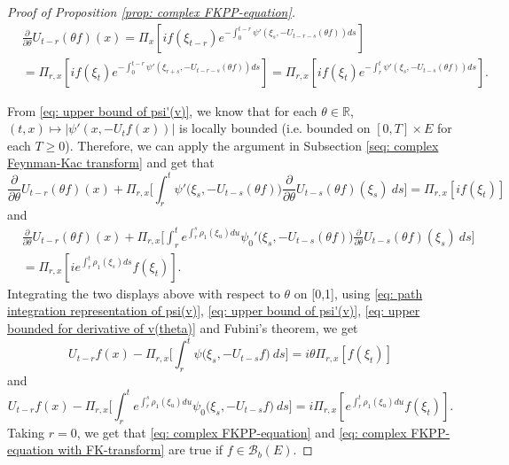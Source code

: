 \documentclass[12pt,a4paper]{amsart}
\theoremstyle{plain}
\theoremstyle{definition}
\numberwithin{equation}{section}
\begin{document}
\begin{proof}[Proof of Proposition \ref{prop: complex FKPP-equation}]
\begin{equation}\begin{split}
    &\frac{\partial}{\partial \theta} U_{t-r}(\theta f)( x)
    = \Pi_x[ i f(\xi_{t-r}) e^{-\int_0^{t-r} \psi'(\xi_s, -U_{t-r-s}(\theta f)) ds} ]
    \\&= \Pi_{r,x}[i f(\xi_t)e^{-\int_0^{t-r} \psi'(\xi_{r+s}, -U_{t-r-s}(\theta f)) ds} ]
    = \Pi_{r,x}[if(\xi_t)e^{-\int_r^t \psi'(\xi_{s}, -U_{t-s}(\theta f)) ds} ].
\end{split}\end{equation}

    From \eqref{eq: upper bound of psi'(v)}, we know that for each $\theta\in \mathbb R$, $(t,x) \mapsto |\psi'(x,-U_tf(x))|$ is locally bounded (i.e. bounded on $[0,T]\times E$ for each $T \geq 0$).
    Therefore, we can apply the argument in Subsection \ref{seq: complex Feynman-Kac transform} and get that
\[
    \frac{\partial}{\partial \theta} U_{t-r}(\theta f)(x) + \Pi_{r,x} \Big[\int_r^t \psi'\big(\xi_s,- U_{t-s}(\theta f)\big)\frac{\partial}{\partial \theta} U_{t-s}(\theta f)(\xi_s)~ds\Big]
    = \Pi_{r,x} [i f(\xi_t)]
\]
    and
\begin{equation}\begin{split}
    &\frac{\partial}{\partial \theta} U_{t-r}(\theta f)(x) + \Pi_{r,x} \Big[\int_r^t e^{\int_r^s \rho_1(\xi_u)du}\psi_0'\big(\xi_s,- U_{t-s}(\theta f)\big)\frac{\partial}{\partial \theta} U_{t-s}(\theta f)(\xi_s)~ds\Big]\\
    &= \Pi_{r,x} [i e^{\int_r^t \rho_1(\xi_s)ds}f(\xi_t)].
\end{split}\end{equation}
    Integrating the two displays above with respect to $\theta$  on [0,1], using \eqref{eq: path integration representation of psi(v)}, \eqref{eq: upper bound of psi'(v)}, \eqref{eq: upper bounded for derivative of v(theta)} and Fubini's theorem, we get
\begin{equation}
    U_{t-r}f(x) - \Pi_{r,x} \Big[\int_r^t \psi\big(\xi_s,-U_{t-s}f\big) ~ds\Big]
    = i\theta \Pi_{r,x} [f(\xi_t)]
\end{equation}
    and
\begin{equation}
    U_{t-r}f(x) - \Pi_{r,x} \Big[\int_r^t e^{\int_r^s \rho_1(\xi_u)du} \psi_0\big(\xi_s,- U_{t-s}f\big) ~ds\Big]
    = i\Pi_{r,x} [e^{\int_r^t\rho_1(\xi_u)du}f(\xi_t)].
\end{equation}
    Taking $r = 0$, we get that \eqref{eq: complex FKPP-equation} and \eqref{eq: complex FKPP-equation with FK-transform} are true if $f\in \mathcal B_b(E)$.


\end{proof}
\end{document}
